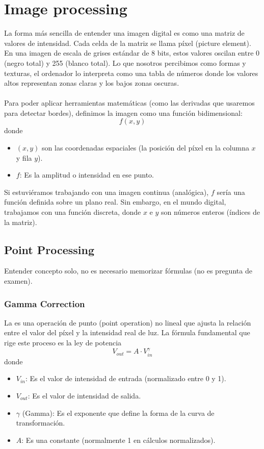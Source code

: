 \chapter{Image processing}

\noindent
La forma más sencilla de entender una imagen digital es como una matriz de valores de intensidad. Cada celda de la matriz se llama píxel (picture element). En una imagen de escala de grises estándar de 8 bits, estos valores oscilan entre 0 (negro total) y 255 (blanco total). Lo que nosotros percibimos como formas y texturas, el ordenador lo interpreta como una tabla de números donde los valores altos representan zonas claras y los bajos zonas oscuras. \\ \\
\noindent
Para poder aplicar herramientas matemáticas (como las derivadas que usaremos para detectar bordes), definimos la imagen como una función bidimensional:
$$f(x, y)$$
donde 
\begin{itemize}
    \item $(x, y)$ son las coordenadas espaciales (la posición del píxel en la columna $x$ y fila $y$).
    \item $f$: Es la amplitud o intensidad en ese punto.
\end{itemize}
Si estuviéramos trabajando con una imagen continua (analógica), $f$ sería una función definida sobre un plano real. Sin embargo, en el mundo digital, trabajamos con una función discreta, donde $x$ e $y$ son números enteros (índices de la matriz).


\section{Point Processing}
\noindent 
Entender concepto solo, no es necesario memorizar fórmulas (no es pregunta de examen). 

\subsection{Gamma Correction}
\noindent
La  es una operación de punto (point operation) no lineal que ajusta la relación entre el valor del píxel y la intensidad real de luz. La fórmula fundamental que rige este proceso es la ley de potencia
$$V_{out} = A \cdot V_{in}^{\gamma}$$
donde
\begin{itemize}
    \item $V_{in}$: Es el valor de intensidad de entrada (normalizado entre 0 y 1).
    \item $V_{out}$: Es el valor de intensidad de salida.
    \item $\gamma$ (Gamma): Es el exponente que define la forma de la curva de transformación.
    \item $A$: Es una constante (normalmente 1 en cálculos normalizados).
\end{itemize}

